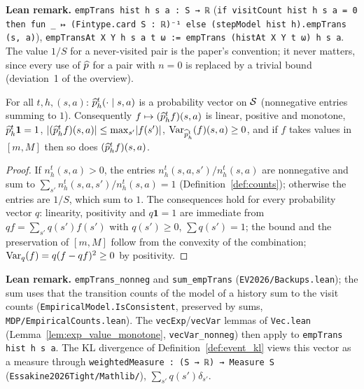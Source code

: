 \textbf{Lean remark.} \texttt{empTrans hist h s a : S → ℝ} (\texttt{if visitCount hist h s a = 0 then fun \_ ↦ (Fintype.card S : ℝ)⁻¹ else (stepModel hist h).empTrans (s, a)}),
\texttt{empTransAt X Y h s a t ω := empTrans (histAt X Y t ω) h s a}. The value $1/S$ for a
never-visited pair is the paper's convention; it never matters, since every use of $\widehat{p}$
for a pair with $n = 0$ is replaced by a trivial bound (deviation~1 of the overview).

\begin{lemma}\label{lem:emp_trans_simplex}
\leanok
{}
For all $t, h, (s, a)$: $\widehat{p}_h^t(\cdot \mid s, a)$ is a probability vector on $\mathcal{S}$
(nonnegative entries summing to $1$). Consequently $f \mapsto (\widehat{p}_h^t f)(s, a)$ is linear,
positive and monotone, $\widehat{p}_h^t \mathbf 1 = 1$, $\lvert (\widehat{p}_h^t f)(s, a) \rvert \le \max_{s'} \lvert f(s') \rvert$,
$\operatorname{Var}_{\widehat{p}_h^t}(f)(s, a) \ge 0$, and if $f$ takes values in $[m, M]$ then so does $(\widehat{p}_h^t f)(s, a)$.
\end{lemma}

\begin{proof}
\leanok
If $n_h^t(s, a) > 0$, the entries $n_h^t(s, a, s')/n_h^t(s, a)$ are nonnegative and sum to
$\sum_{s'} n_h^t(s, a, s')/n_h^t(s, a) = 1$ (Definition~\ref{def:counts}); otherwise the entries are
$1/S$, which sum to $1$. The consequences hold for every probability vector $q$: linearity,
positivity and $q \mathbf 1 = 1$ are immediate from $q f = \sum_{s'} q(s') f(s')$ with
$q(s') \ge 0$, $\sum q(s') = 1$; the bound and the preservation of $[m, M]$ follow from the
convexity of the combination; $\operatorname{Var}_q(f) = q(f - qf)^2 \ge 0$ by positivity.
\end{proof}

\textbf{Lean remark.} \texttt{empTrans\_nonneg} and \texttt{sum\_empTrans}
(\texttt{EV2026/Backups.lean}); the sum uses that the transition counts of the model of a history
sum to the visit counts (\texttt{EmpiricalModel.IsConsistent}, preserved by sums,
\texttt{MDP/EmpiricalCounts.lean}). The \texttt{vecExp}/\texttt{vecVar} lemmas of \texttt{Vec.lean}
(Lemma~\ref{lem:exp_value_monotone}, \texttt{vecVar\_nonneg}) then apply to
\texttt{empTrans hist h s a}. The KL divergence of Definition~\ref{def:event_kl} views this
vector as a measure through \texttt{weightedMeasure : (S → ℝ) → Measure S}
(\texttt{Essakine2026Tight/Mathlib/}), $\sum_{s'} q(s') \delta_{s'}$.

